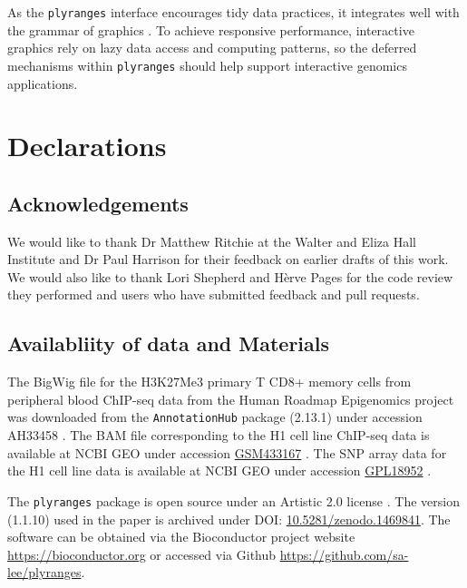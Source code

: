 \documentclass[]{article}
\begin{document}
As the \texttt{plyranges} interface encourages tidy data practices, it
integrates well with the grammar of graphics \cite{Wickham2016-gz}. To
achieve responsive performance, interactive graphics rely on lazy data
access and computing patterns, so the deferred mechanisms within
\texttt{plyranges} should help support interactive genomics
applications.

\hypertarget{declarations}{%
\section{Declarations}\label{declarations}}

\hypertarget{acknowledgements}{%
\subsection{Acknowledgements}\label{acknowledgements}}

We would like to thank Dr Matthew Ritchie at the Walter and Eliza Hall
Institute and Dr Paul Harrison for their feedback on earlier drafts of
this work. We would also like to thank Lori Shepherd and Hèrve Pages for
the code review they performed and users who have submitted feedback and
pull requests.

\hypertarget{availabliity-of-data-and-materials}{%
\subsection{Availabliity of data and
Materials}\label{availabliity-of-data-and-materials}}

The BigWig file for the H3K27Me3 primary T CD8+ memory cells from
peripheral blood ChIP-seq data from the Human Roadmap Epigenomics
project\\
was downloaded from the \texttt{AnnotationHub} package (2.13.1) under
accession AH33458 \cite{R-ahub, Roadmap-Epigenomics-Consortium2015-pr}.
The BAM file corresponding to the H1 cell line ChIP-seq data is
available at NCBI GEO under accession
\href{https://www.ncbi.nlm.nih.gov/geo/query/acc.cgi?acc=GSM433167}{GSM433167}
\cite{ncbi-geo, Roadmap-Epigenomics-Consortium2015-pr}. The SNP array
data for the H1 cell line data is available at NCBI GEO under accession
\href{https://www.ncbi.nlm.nih.gov/geo/query/acc.cgi?acc=GPL18952}{GPL18952}
\cite{Roadmap-Epigenomics-Consortium2015-pr}.

The \texttt{plyranges} package is open source under an Artistic 2.0
license \cite{R-plyranges-z}. The version (1.1.10) used in the paper is
archived under DOI:
\href{https://doi.org/10.5281/zenodo.1469841}{10.5281/zenodo.1469841}.
The software can be obtained via the Bioconductor project website
\url{https://bioconductor.org} or accessed via Github
\url{https://github.com/sa-lee/plyranges}.
\end{document}
